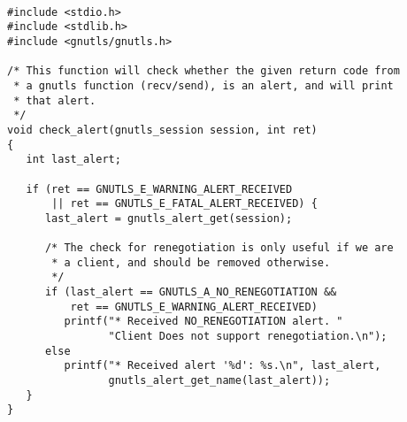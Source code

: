 \begin{verbatim}

#include <stdio.h>
#include <stdlib.h>
#include <gnutls/gnutls.h>

/* This function will check whether the given return code from
 * a gnutls function (recv/send), is an alert, and will print
 * that alert.
 */
void check_alert(gnutls_session session, int ret)
{
   int last_alert;

   if (ret == GNUTLS_E_WARNING_ALERT_RECEIVED
       || ret == GNUTLS_E_FATAL_ALERT_RECEIVED) {
      last_alert = gnutls_alert_get(session);

      /* The check for renegotiation is only useful if we are 
       * a client, and should be removed otherwise.
       */
      if (last_alert == GNUTLS_A_NO_RENEGOTIATION &&
          ret == GNUTLS_E_WARNING_ALERT_RECEIVED)
         printf("* Received NO_RENEGOTIATION alert. "
                "Client Does not support renegotiation.\n");
      else
         printf("* Received alert '%d': %s.\n", last_alert,
                gnutls_alert_get_name(last_alert));
   }
}

\end{verbatim}
